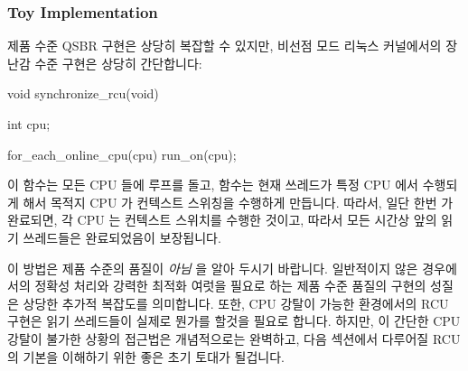 \subsubsection{Toy Implementation}
\label{sec:defer:Toy Implementation}

제품 수준 QSBR 구현은 상당히 복잡할 수 있지만, 비선점 모드 리눅스 커널에서의
장난감 수준 구현은 상당히 간단합니다:

\begin{VerbatimN}[samepage=true]
void synchronize_rcu(void)
{
	int cpu;

	for_each_online_cpu(cpu)
		run_on(cpu);
}
\end{VerbatimN}

이  함수는 모든 CPU 들에 루프를 돌고, 
함수는 현재 쓰레드가 특정 CPU 에서 수행되게 해서 목적지 CPU 가 컨텍스트
스위칭을 수행하게 만듭니다.
따라서, 일단 한번  가 완료되면, 각 CPU 는 컨텍스트
스위치를 수행한 것이고, 따라서 모든 시간상 앞의 읽기 쓰레드들은 완료되었음이
보장됩니다.

이 방법은 제품 수준의 품질이 \emph{아님} 을 알아 두시기 바랍니다.
일반적이지 않은 경우에서의 정확성 처리와 강력한 최적화 여럿을 필요로 하는 제품
수준 품질의 구현의 성질은 상당한 추가적 복잡도를 의미합니다.
또한, CPU 강탈이 가능한 환경에서의 RCU 구현은 읽기 쓰레드들이 실제로 뭔가를
할것을 필요로 합니다.
하지만, 이 간단한 CPU 강탈이 불가한 상황의 접근법은 개념적으로는 완벽하고, 다음
섹션에서 다루어질 RCU 의 기본을 이해하기 위한 좋은 초기 토대가 될겁니다.

